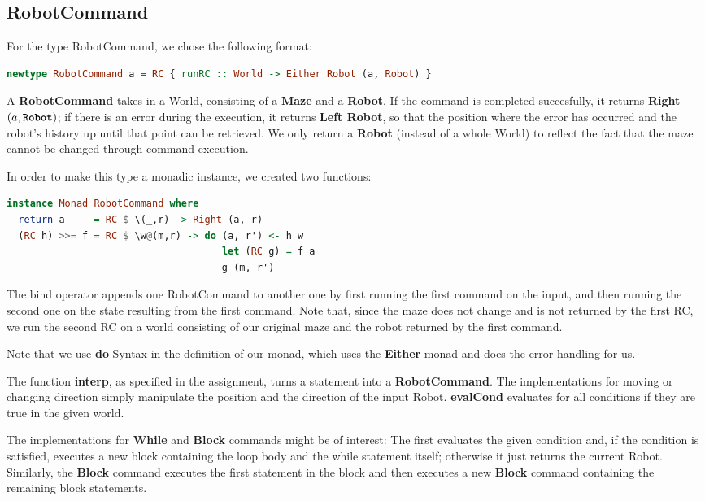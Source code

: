 \documentclass[a4paper]{article}
\newcommand{\func}[1]{\textbf{\ttfamily #1}\xspace}
\begin{document}
\subsection{\func{RobotCommand}}
For the type RobotCommand, we chose the following format:
\begin{lstlisting}[language=haskell]
newtype RobotCommand a = RC { runRC :: World -> Either Robot (a, Robot) }
\end{lstlisting}
A \func{RobotCommand} takes in a World, consisting of a \func{Maze} and a \func{Robot}. If the command is completed succesfully, it returns \func{Right} $(a, \text{\func{Robot}})$; if there is an error during the execution, it returns \func{Left Robot}, so that the position where the error has occurred and the robot's history up until that point can be retrieved. We only return a \func{Robot} (instead of a whole World) to reflect the fact that the maze cannot be changed through command execution.

In order to make this type a monadic instance, we created two functions:

\begin{lstlisting}[language=haskell]
instance Monad RobotCommand where
  return a     = RC $ \(_,r) -> Right (a, r)
  (RC h) >>= f = RC $ \w@(m,r) -> do (a, r') <- h w
                                     let (RC g) = f a
                                     g (m, r')
\end{lstlisting}

The bind operator appends one RobotCommand to another one by first running the first command on the input, and then running the second one on the state resulting from the first command. Note that, since the maze does not change and is not returned by the first RC, we run the second RC on a world consisting of our original maze and the robot returned by the first command.

Note that we use \func{do}-Syntax in the definition of our monad, which uses the \func{Either} monad and does the error handling for us.

The function \func{interp}, as specified in the assignment, turns a statement into a \func{RobotCommand}. The implementations for moving or changing direction simply manipulate the position and the direction of the input Robot. \func{evalCond} evaluates for all conditions if they are true in the given world. 

The implementations for \func{While} and \func{Block} commands might be of interest: The first evaluates the given condition and, if the condition is satisfied, executes a new block containing the loop body and the while statement itself; otherwise it just returns the current Robot. Similarly, the \func{Block} command executes the first statement in the block and then executes a new \func{Block} command containing the remaining block statements.
\end{document}
